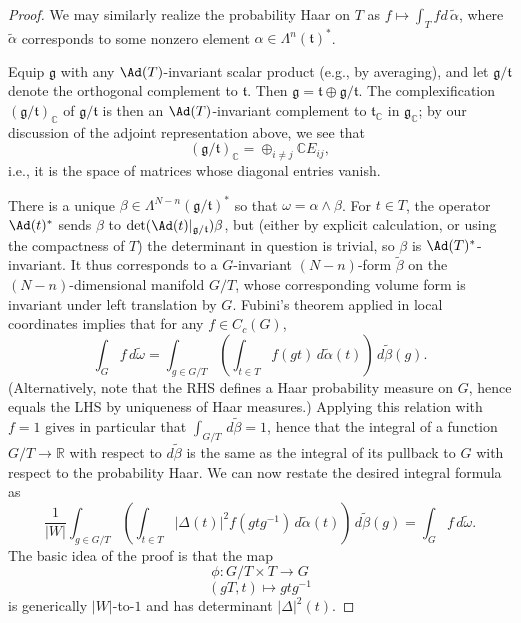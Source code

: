 \documentclass[reqno]{amsart} 
\begin{document}
\begin{proof}
  We may similarly realize the probability Haar on $T$ as $f \mapsto \int_T f d \, \tilde{\alpha}$, where $\tilde{\alpha}$ corresponds to some nonzero element $\alpha \in \Lambda^n(\mathfrak{t})^*$.

  Equip $\mathfrak{g}$ with any $\Ad(T)$-invariant scalar product (e.g., by averaging), and let $\mathfrak{g}/\mathfrak{t}$ denote the orthogonal complement to $\mathfrak{t}$.  Then $\mathfrak{g} = \mathfrak{t} \oplus \mathfrak{g}/\mathfrak{t}$.  The complexification $(\mathfrak{g}/\mathfrak{t})_{\mathbb{C}}$ of $\mathfrak{g}/\mathfrak{t}$ is then an $\Ad(T)$-invariant complement to $\mathfrak{t}_{\mathbb{C}}$ in $\mathfrak{g}_{\mathbb{C}}$; by our discussion of the adjoint representation above, we see that
  \begin{equation}\label{eq:}
    (\mathfrak{g}/\mathfrak{t})_{\mathbb{C}}
    = \oplus_{i \neq j} \mathbb{C} E_{i j},
  \end{equation}
  i.e., it is the space of matrices whose diagonal entries vanish.
  
  There is a unique $\beta \in \Lambda^{N-n}(\mathfrak{g}/\mathfrak{t})^*$ so that $\omega = \alpha \wedge \beta$.  For $t \in T$, the operator $\Ad(t)^*$ sends $\beta$ to $\det(\Ad(t)|_{\mathfrak{g}/\mathfrak{t}}) \beta$, but (either by explicit calculation, or using the compactness of $T$) the determinant in question is trivial, so $\beta$ is $\Ad(T)^*$-invariant.  It thus corresponds to a $G$-invariant $(N-n)$-form $\tilde{\beta}$ on the $(N-n)$-dimensional manifold $G/T$, whose corresponding volume form is invariant under left translation by $G$.  Fubini's theorem applied in local coordinates implies that for any $f \in C_c(G)$,
  \begin{equation}\label{eq:}
    \int_G f \, d \tilde{\omega}
    =
    \int_{g \in G/T}
    (\int_{t \in T}
    f(g t) \, d \tilde{\alpha}(t))
    \, d \tilde{\beta}(g).
  \end{equation}
  (Alternatively, note that the RHS defines a Haar probability measure on $G$, hence equals the LHS by uniqueness of Haar measures.)  Applying this relation with $f = 1$ gives in particular that $\int_{G/T} \, d \tilde{\beta} = 1$, hence that the integral of a function $G/T \rightarrow \mathbb{R}$ with respect to $d \tilde{\beta}$ is the same as the integral of its pullback to $G$ with respect to the probability Haar.  We can now restate the desired integral formula as
  \begin{equation}\label{eq:weyl-integral-via-diff-forms}
    \frac{1}{|W|}
    \int_{g \in G/T}
    (\int_{t \in T}
    |\Delta(t)|^2
    f(g t g^{-1}) \, d \tilde{\alpha}(t))
    \, d \tilde{\beta}(g)
    =
    \int_{G}  f \, d \tilde{\omega}.
  \end{equation}
  The basic idea of the proof is that the map
  \begin{equation*}
    \phi : G/T \times T \rightarrow G
  \end{equation*}
  \begin{equation*}
    (g T,t) \mapsto g t g^{-1}
  \end{equation*}
  is generically $|W|$-to-$1$ and has determinant $|\Delta|^2(t)$.


\end{proof}
\end{document}
